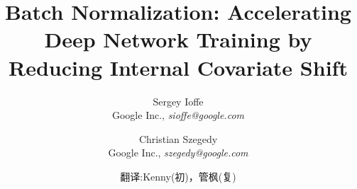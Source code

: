 \documentclass[twocolumn]{article}
\begin{document}
\newcommand{\jac}[2]{\frac{\partial #1}{\partial #2}}
\newcommand{\xhat}{\widehat{x}}
\newcommand{\yhat}{\widehat{y}}
\newcommand{\zhat}{\widehat{z}}
\newcommand{\vxhat}{\widehat\mathrm{x}}
\newcommand{\vzhat}{\widehat\mathrm{z}}
\newcommand{\setX}{\mathcal{X}}
\newcommand{\setB}{\mathcal{B}}
\newcommand{\E}{\text{E}}
\newcommand{\Var}{\text{Var}}
\newcommand{\Cov}{\text{Cov}}
\newcommand{\Fhat}{\widehat{F}}
\newcommand{\Thetahat}{\widehat{\Theta}}
\newcommand{\Norm}{\text{Norm}}
\newcommand{\BatchNorm}{\text{BN}}
\newcommand{\kk}{{(k)}}
\newcommand{\vx}{\mathrm{x}}
\newcommand{\vy}{\mathrm{y}}
\newcommand{\vz}{\mathrm{z}}
\newcommand{\vb}{\mathrm{b}}
\newcommand{\vu}{\mathrm{u}}
\newcommand{\comt}{// }
\renewcommand{\algorithmiccomment}[1]{\comt #1}
\newcommand{\BN}[2]{\text{BN}_{#2}(#1)}
\renewcommand{\algorithmicrequire}{\textbf{Input:}}
\renewcommand{\algorithmicensure}{\textbf{Output:}}
\newcommand{\mils}{\cdot 10^6}
\newcommand{\netw}[1]{{\sl #1}}
\newcommand{\norig}{\text{\sl N}}
\newcommand{\ntrain}{\norig_\mathrm{BN}^\mathrm{tr}}
\newcommand{\ninf}{\norig_\mathrm{BN}^\mathrm{inf}}
\renewcommand{\cite}[1]{\citep{#1}}


\title{Batch Normalization: Accelerating Deep Network Training by Reducing Internal Covariate Shift}

\author{Sergey Ioffe \\Google Inc., {\sl sioffe@google.com} \and
Christian Szegedy \\Google Inc., {\sl szegedy@google.com} \and 翻译:Kenny(初)，管枫(复)
}

\date{}

\maketitle
\end{document}
